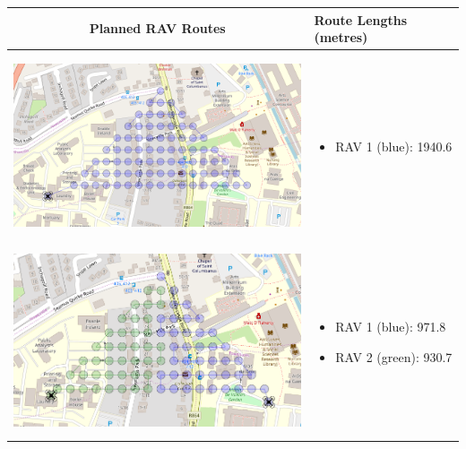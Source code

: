 \begin{table}[H]
  \centering
  \begin{tabular}{ | c | m{5cm} | }
    \hline
    Planned RAV Routes & Route Lengths (metres) \\
    \hline
    
    \begin{minipage}[c][57mm][c]{.6\textwidth}
      \includegraphics[width=\linewidth, height=55mm]{Chapters/MultiAgentCoverage/MultipleTravellingSalesman/Figs/Triangle/OneRAV.PNG}
    \end{minipage}
    &
    \begin{itemize}[leftmargin=*]
      \item[] RAV 1 (blue): 1940.6
    \end{itemize}
    \\
    \hline
    \begin{minipage}[c][57mm][c]{.6\textwidth}
      \includegraphics[width=\linewidth, height=55mm]{Chapters/MultiAgentCoverage/MultipleTravellingSalesman/Figs/Triangle/TwoRAV.PNG}
    \end{minipage}
    &
    \begin{itemize}[leftmargin=*]
        \item[] RAV 1 (blue): 971.8
        \item[] RAV 2 (green): 930.7
    \end{itemize}
    \\
    \hline
    

\end{tabular}
\end{table}
